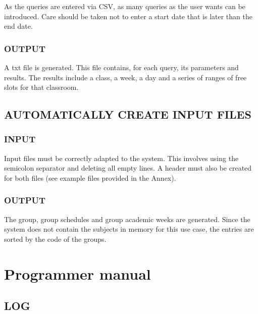 As the queries are entered via CSV, as many queries as the user wants can be introduced. Care should be taken not to enter a start date that is later than the end date.

\subsubsection*{OUTPUT}

A txt file is generated. This file contains, for each query, its parameters and results. The results include a class, a week, a day and a series of ranges of free slots for that classroom.



\subsection*{AUTOMATICALLY CREATE INPUT FILES}


\subsubsection*{INPUT}

Input files must be correctly adapted to the system. This involves using the semicolon separator and deleting all empty lines. A header must also be created for both files (see example files provided in the Annex).

\subsubsection*{OUTPUT}

The group, group schedules and group academic weeks are generated. Since the system does not contain the subjects in memory for this use case, the entries are sorted by the code of the groups.




\section{Programmer manual}


\subsection*{LOG}

